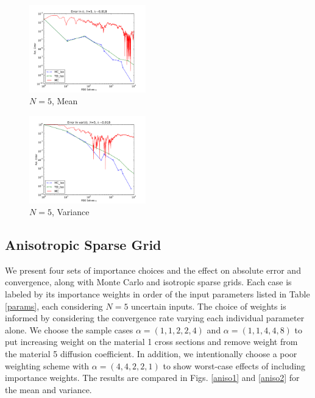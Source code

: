 \documentclass{anstrans} \usepackage{amsmath} \usepackage{amssymb}
\begin{document}
  \begin{figure}[htb] \includegraphics[width=0.45\textwidth]{../graphics/N5_h5_MCHC} \caption{$N=5$, Mean}
    \label{n5mean} \end{figure} \begin{figure}[htb]
    \includegraphics[width=0.45\textwidth]{../graphics/N5_h5_MCHC_2} \caption{$N=5$, Variance} \label{n5var}
  \end{figure}
  
\subsection{Anisotropic Sparse Grid} We present four sets of importance choices and the effect on absolute
error and convergence, along with Monte Carlo and isotropic sparse grids.  Each case is labeled by its
importance weights in order of the input parameters listed in Table \ref{params}, each considering $N=5$
uncertain inputs. The choice of weights is informed by considering the convergence rate varying each
individual parameter alone.  We choose the sample cases $\alpha=(1,1,2,2,4)$ and $\alpha=(1,1,4,4,8)$ to put
increasing weight on the material 1 cross sections and remove weight from the material 5 diffusion
coefficient.  In addition, we intentionally choose a poor weighting scheme with $\alpha=(4,4,2,2,1)$ to show
worst-case effects of including importance weights.  The results are compared in Figs. \ref{aniso1} and
\ref{aniso2} for the mean and variance. 
\end{document}
